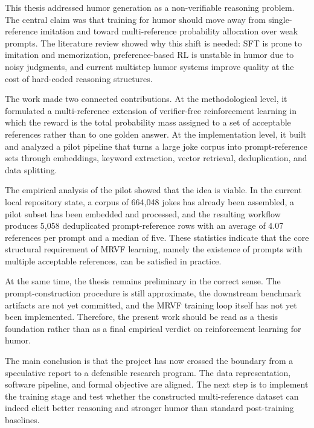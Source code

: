 This thesis addressed humor generation as a non-verifiable reasoning problem. The central claim was that training for humor should move away from single-reference imitation and toward multi-reference probability allocation over weak prompts. The literature review showed why this shift is needed: SFT is prone to imitation and memorization, preference-based RL is unstable in humor due to noisy judgments, and current multistep humor systems improve quality at the cost of hard-coded reasoning structures.

The work made two connected contributions. At the methodological level, it formulated a multi-reference extension of verifier-free reinforcement learning in which the reward is the total probability mass assigned to a set of acceptable references rather than to one golden answer. At the implementation level, it built and analyzed a pilot pipeline that turns a large joke corpus into prompt-reference sets through embeddings, keyword extraction, vector retrieval, deduplication, and data splitting.

The empirical analysis of the pilot showed that the idea is viable. In the current local repository state, a corpus of 664{,}048 jokes has already been assembled, a pilot subset has been embedded and processed, and the resulting workflow produces 5{,}058 deduplicated prompt-reference rows with an average of 4.07 references per prompt and a median of five. These statistics indicate that the core structural requirement of MRVF learning, namely the existence of prompts with multiple acceptable references, can be satisfied in practice.

At the same time, the thesis remains preliminary in the correct sense. The prompt-construction procedure is still approximate, the downstream benchmark artifacts are not yet committed, and the MRVF training loop itself has not yet been implemented. Therefore, the present work should be read as a thesis foundation rather than as a final empirical verdict on reinforcement learning for humor.

The main conclusion is that the project has now crossed the boundary from a speculative report to a defensible research program. The data representation, software pipeline, and formal objective are aligned. The next step is to implement the training stage and test whether the constructed multi-reference dataset can indeed elicit better reasoning and stronger humor than standard post-training baselines.
